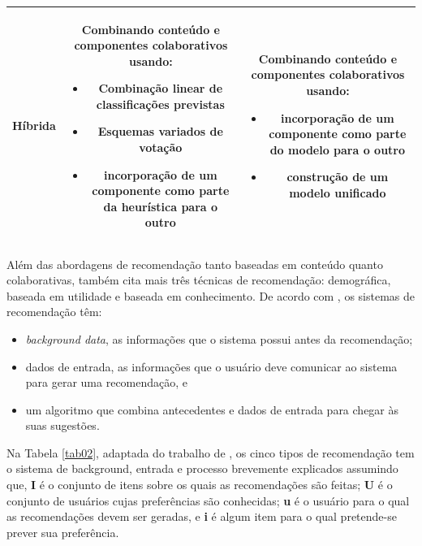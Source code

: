 \begin{table}[]
\begin{tabular}{|c|c|c|}
	\textbf{Híbrida} &  \begin{minipage} [t] {0.3\textwidth} Combinando conteúdo e componentes colaborativos usando: \begin{itemize} \item Combinação linear de classificações previstas \item Esquemas variados de votação \item incorporação de um componente como parte da heurística para o outro \end{itemize}        \end{minipage} & \begin{minipage} [t] {0.3\textwidth} Combinando conteúdo e componentes colaborativos usando: \begin{itemize} \item incorporação de um componente como parte do modelo para o outro \item construção de um modelo unificado \end{itemize} \end{minipage} \\ \hline
	\end{tabular}
\end{table}

Além das abordagens de recomendação tanto baseadas em conteúdo quanto colaborativas,  também cita mais três técnicas de recomendação: demográfica, baseada em utilidade e 
baseada em conhecimento. De acordo com , os sistemas de recomendação têm: 

\begin{itemize}

	\item \emph{background data}, as informações que o sistema possui antes da recomendação;

	\item dados de entrada, as informações que o usuário deve comunicar ao
	sistema para gerar uma recomendação, e

	\item um algoritmo que combina antecedentes e dados de entrada para chegar às suas sugestões.

\end{itemize}

Na Tabela \ref{tab02}, adaptada do trabalho de , os cinco tipos de recomendação tem o sistema de background, entrada e processo brevemente explicados 
assumindo que, \textbf{I} é o conjunto de itens sobre os quais as recomendações são feitas; \textbf{U} é o conjunto de usuários cujas preferências são conhecidas; \textbf{u} 
é o usuário para o qual as recomendações devem ser geradas, e \textbf{i} é algum item para o qual pretende-se prever sua preferência.

